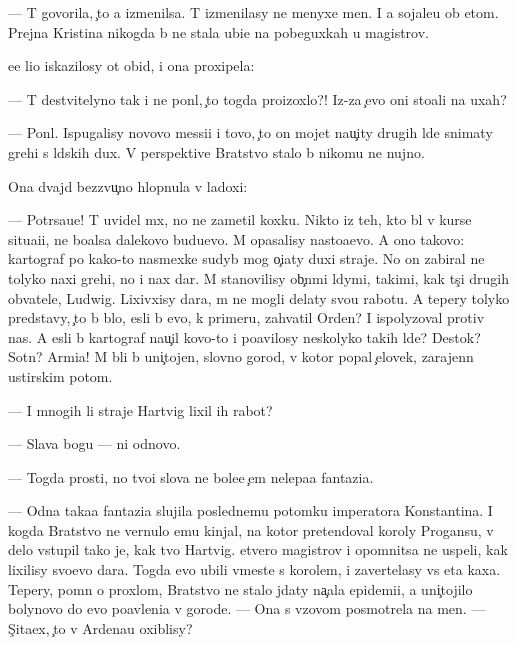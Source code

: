 \documentclass[10pt]{book}
\begin{document}
— T{\yi} govorila, {\c}to {\y}a izmenilsa. T{\yi} izmenilasy ne menyxe men{\ia}. I {\y}a sojale{\y}u ob etom. Prejn{\ia}{\y}a Kristina nikogda b{\yi} ne stala ubi{\y}{\q}e{\y} na pobeguxkah u magistrov.

{\Y}ee li{\q}o iskazilosy ot obid{\yi}, i ona proxipela:

— T{\yi} de{\y}stvitelyno tak i ne pon{\ia}l, {\c}to togda pro{\y}izoxlo?! Iz-za {\c}evo oni sto{\y}ali na uxah?

— Pon{\ia}l. Ispugalisy novovo messi{\y}i i tovo, {\c}to on mojet nau{\c}ity drugih l{\iu}de{\y} snimaty grehi s l{\iu}dskih dux. V perspektive Bratstvo stalo b{\yi} nikomu ne nujno.

Ona dvajd{\yi} bezzvu{\c}no hlopnula v ladoxi:

— Potr{\ia}sa{\y}u{\x}e! T{\yi} uvidel m{\yi}x, no ne zametil koxku. Nikto iz teh, kto b{\yi}l v kurse situa{\q}i{\y}i, ne bo{\y}alsa dalekovo budu{\x}evo. M{\yi} opasalisy nasto{\y}a{\x}evo. A ono takovo: kartograf po kako{\y}-to nasmexke sudyb{\yi} mog o{\c}i{\x}aty duxi straje{\y}. No on zabiral ne tolyko naxi grehi, no i nax dar. M{\yi} stanovilisy ob{\yi}{\c}n{\yi}mi l{\iu}dymi, takimi, kak t{\yi}s{\ia}{\c}i drugih ob{\yi}vatele{\y}, Ludwig. Lixivxisy dara, m{\yi} ne mogli delaty svo{\y}u rabotu. A tepery tolyko predstavy, {\c}to b{\yi} b{\yi}lo, {\y}esli b{\yi} {\y}evo, k primeru, zahvatil Orden? I ispolyzoval protiv nas. A {\y}esli b{\yi} kartograf nau{\c}il kovo-to i po{\y}avilosy neskolyko takih l{\iu}de{\y}? Des{\ia}tok? Sotn{\ia}? Armi{\y}a! M{\yi} b{\yi}li b{\yi} uni{\c}tojen{\yi}, slovno gorod, v kotor{\yi}{\y} popal {\c}elovek, zarajenn{\yi}{\y} {\y}ustirskim potom.

— I mnogih li straje{\y} Hartvig lixil ih rabot{\yi}?

— Slava bogu — ni odnovo.

— Togda prosti, no tvo{\y}i slova ne bole{\y}e {\c}em nelepa{\y}a fantazi{\y}a.

— Odna taka{\y}a fantazi{\y}a slujila poslednemu potomku imperatora Konstantina. I kogda Bratstvo ne vernulo {\y}emu kinjal, na kotor{\yi}{\y} pretendoval koroly Progansu, v delo vstupil tako{\y} je, kak tvo{\y} Hartvig. {\C}etvero magistrov i opomnitsa ne uspeli, kak lixilisy svo{\y}evo dara. Togda {\y}evo ubili vmeste s korolem, i zavertelasy vs{\ia} eta kaxa. Tepery, pomn{\ia} o proxlom, Bratstvo ne stalo jdaty na{\c}ala epidemi{\y}i, a uni{\c}tojilo bolynovo do {\y}evo po{\y}avleni{\y}a v gorode. — Ona s v{\yi}zovom posmotrela na men{\ia}. — S{\c}ita{\y}ex, {\c}to v Ardenau oxiblisy?
\end{document}
